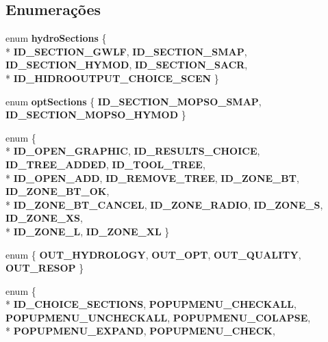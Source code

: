 \subsection*{Enumerações}
\begin{DoxyCompactItemize}
\item 
enum {\bf hydro\+Sections} \{ \\*
{\bf I\+D\+\_\+\+S\+E\+C\+T\+I\+O\+N\+\_\+\+G\+W\+LF}, 
{\bf I\+D\+\_\+\+S\+E\+C\+T\+I\+O\+N\+\_\+\+S\+M\+AP}, 
{\bf I\+D\+\_\+\+S\+E\+C\+T\+I\+O\+N\+\_\+\+H\+Y\+M\+OD}, 
{\bf I\+D\+\_\+\+S\+E\+C\+T\+I\+O\+N\+\_\+\+S\+A\+CR}, 
\\*
{\bf I\+D\+\_\+\+H\+I\+D\+R\+O\+O\+U\+T\+P\+U\+T\+\_\+\+C\+H\+O\+I\+C\+E\+\_\+\+S\+C\+EN}
 \}
\item 
enum {\bf opt\+Sections} \{ {\bf I\+D\+\_\+\+S\+E\+C\+T\+I\+O\+N\+\_\+\+M\+O\+P\+S\+O\+\_\+\+S\+M\+AP}, 
{\bf I\+D\+\_\+\+S\+E\+C\+T\+I\+O\+N\+\_\+\+M\+O\+P\+S\+O\+\_\+\+H\+Y\+M\+OD}
 \}
\item 
enum \{ \\*
{\bf I\+D\+\_\+\+O\+P\+E\+N\+\_\+\+G\+R\+A\+P\+H\+IC}, 
{\bf I\+D\+\_\+\+R\+E\+S\+U\+L\+T\+S\+\_\+\+C\+H\+O\+I\+CE}, 
{\bf I\+D\+\_\+\+T\+R\+E\+E\+\_\+\+A\+D\+D\+ED}, 
{\bf I\+D\+\_\+\+T\+O\+O\+L\+\_\+\+T\+R\+EE}, 
\\*
{\bf I\+D\+\_\+\+O\+P\+E\+N\+\_\+\+A\+DD}, 
{\bf I\+D\+\_\+\+R\+E\+M\+O\+V\+E\+\_\+\+T\+R\+EE}, 
{\bf I\+D\+\_\+\+Z\+O\+N\+E\+\_\+\+BT}, 
{\bf I\+D\+\_\+\+Z\+O\+N\+E\+\_\+\+B\+T\+\_\+\+OK}, 
\\*
{\bf I\+D\+\_\+\+Z\+O\+N\+E\+\_\+\+B\+T\+\_\+\+C\+A\+N\+C\+EL}, 
{\bf I\+D\+\_\+\+Z\+O\+N\+E\+\_\+\+R\+A\+D\+IO}, 
{\bf I\+D\+\_\+\+Z\+O\+N\+E\+\_\+S}, 
{\bf I\+D\+\_\+\+Z\+O\+N\+E\+\_\+\+XS}, 
\\*
{\bf I\+D\+\_\+\+Z\+O\+N\+E\+\_\+L}, 
{\bf I\+D\+\_\+\+Z\+O\+N\+E\+\_\+\+XL}
 \}
\item 
enum \{ {\bf O\+U\+T\+\_\+\+H\+Y\+D\+R\+O\+L\+O\+GY}, 
{\bf O\+U\+T\+\_\+\+O\+PT}, 
{\bf O\+U\+T\+\_\+\+Q\+U\+A\+L\+I\+TY}, 
{\bf O\+U\+T\+\_\+\+R\+E\+S\+OP}
 \}
\item 
enum \{ \\*
{\bf I\+D\+\_\+\+C\+H\+O\+I\+C\+E\+\_\+\+S\+E\+C\+T\+I\+O\+NS}, 
{\bf P\+O\+P\+U\+P\+M\+E\+N\+U\+\_\+\+C\+H\+E\+C\+K\+A\+LL}, 
{\bf P\+O\+P\+U\+P\+M\+E\+N\+U\+\_\+\+U\+N\+C\+H\+E\+C\+K\+A\+LL}, 
{\bf P\+O\+P\+U\+P\+M\+E\+N\+U\+\_\+\+C\+O\+L\+A\+P\+SE}, 
\\*
{\bf P\+O\+P\+U\+P\+M\+E\+N\+U\+\_\+\+E\+X\+P\+A\+ND}, 
{\bf P\+O\+P\+U\+P\+M\+E\+N\+U\+\_\+\+C\+H\+E\+CK}, 

\end{DoxyCompactItemize}
